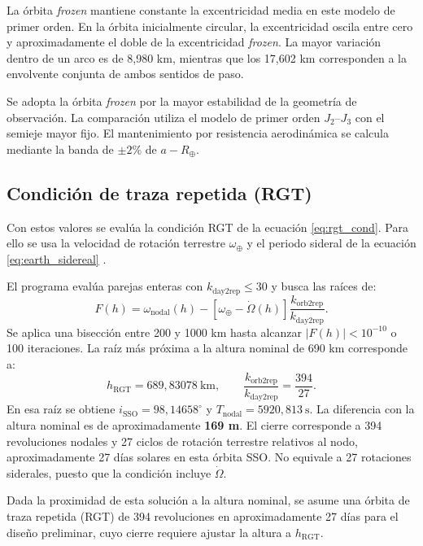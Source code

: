 La órbita \textit{frozen} mantiene constante la excentricidad media en este modelo de primer orden. En la órbita inicialmente circular, la excentricidad oscila entre cero y aproximadamente el doble de la excentricidad \textit{frozen}. La mayor variación dentro de un arco es de 8,980 km, mientras que los 17,602 km corresponden a la envolvente conjunta de ambos sentidos de paso.

Se adopta la órbita \textit{frozen} por la mayor estabilidad de la geometría de observación. La comparación utiliza el modelo de primer orden $J_2$--$J_3$ con el semieje mayor fijo. El mantenimiento por resistencia aerodinámica se calcula mediante la banda de \(\pm2\%\) de \(a-R_\oplus\).

\subsection{Condición de traza repetida (RGT)}

Con estos valores se evalúa la condición RGT de la ecuación \eqref{eq:rgt_cond}. Para ello se usa la velocidad de rotación terrestre \(\omega_{\oplus}\) y el periodo sideral de la ecuación \eqref{eq:earth_sidereal} \cite{vallado2013fundamentals}.

El programa evalúa parejas enteras con \(k_{\mathrm{day2rep}}\leq30\) y busca las raíces de:
\begin{equation}
F(h)=\omega_{\mathrm{nodal}}(h)
-\left[\omega_{\oplus}-\dot\Omega(h)\right]
\frac{k_{\mathrm{orb2rep}}}{k_{\mathrm{day2rep}}}.
\label{eq:rgt_residual}
\end{equation}
Se aplica una bisección entre 200 y 1000 km hasta alcanzar \(\lvert F(h)\rvert<10^{-10}\) o 100 iteraciones. La raíz más próxima a la altura nominal de 690 km corresponde a:
\begin{equation}
h_{\mathrm{RGT}}=689{,}83078\ \mathrm{km},\qquad
\frac{k_{\mathrm{orb2rep}}}{k_{\mathrm{day2rep}}}=\frac{394}{27}.
\label{eq:h_rgt}
\end{equation}
En esa raíz se obtiene \(i_{\mathrm{SSO}}=98{,}14658^\circ\) y \(T_{\mathrm{nodal}}=5920{,}813\ \mathrm{s}\). La diferencia con la altura nominal es de aproximadamente \textbf{169 m}. El cierre corresponde a 394 revoluciones nodales y 27 ciclos de rotación terrestre relativos al nodo, aproximadamente 27 días solares en esta órbita SSO. No equivale a 27 rotaciones siderales, puesto que la condición incluye \(\dot\Omega\).

Dada la proximidad de esta solución a la altura nominal, se asume una órbita de traza repetida (RGT) de 394 revoluciones en aproximadamente 27 días para el diseño preliminar, cuyo cierre requiere ajustar la altura a \(h_{\mathrm{RGT}}\).

